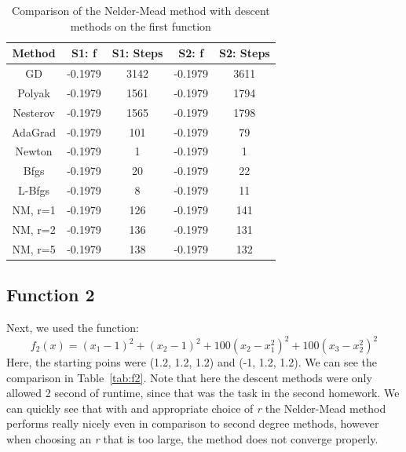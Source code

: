\documentclass[9pt]{IEEEtran}
\begin{document}
\begin{table}[h!]
    \centering
    \begin{tabular}{|c|c|c|c|c|}
        \hline
        \textbf{Method} & \textbf{S1: f} & \textbf{S1: Steps} & \textbf{S2: f} & \textbf{S2: Steps} \\ \hline
        GD         & -0.1979  & 3142  & -0.1979  & 3611 \\ \hline
        Polyak     & -0.1979  & 1561  & -0.1979  & 1794 \\ \hline
        Nesterov   & -0.1979  & 1565  & -0.1979  & 1798 \\ \hline
        AdaGrad    & -0.1979  & 101   & -0.1979  & 79   \\ \hline
        Newton     & -0.1979  & 1     & -0.1979  & 1    \\ \hline
        Bfgs       & -0.1979  & 20    & -0.1979  & 22   \\ \hline
        L-Bfgs    & -0.1979  & 8     & -0.1979  & 11   \\ \hline
        NM, r=1 & -0.1979 & 126 & -0.1979 & 141  \\ \hline
        NM, r=2 & -0.1979 & 136 & -0.1979 & 131  \\ \hline
        NM, r=5 & -0.1979 & 138 & -0.1979 & 132  \\ \hline

    \end{tabular}
    \vspace{3pt}
    \caption{Comparison of the Nelder-Mead method with descent methods on the first 
    function}
    \label{tab:f1}
\end{table}

\subsection*{Function 2}
Next, we used the function:
\[
f_2(x) = (x_1 - 1)^2 + (x_2 - 1)^2 + 100(x_2 - x_1^2)^2 + 100(x_3 - x_2^2)^2
\]
Here, the starting poins were (1.2, 1.2, 1.2) and (-1, 1.2, 1.2). 
We can see the comparison in Table~\ref{tab:f2}. Note that here the descent methods 
were only allowed 2 second of runtime, since that was the task in the second homework.
We can quickly see that with and appropriate choice of \textit{r} the 
Nelder-Mead method performs really nicely even in comparison to second degree 
methods, however when choosing 
an \textit{r} that is too large, the method does not converge properly.
\end{document}
